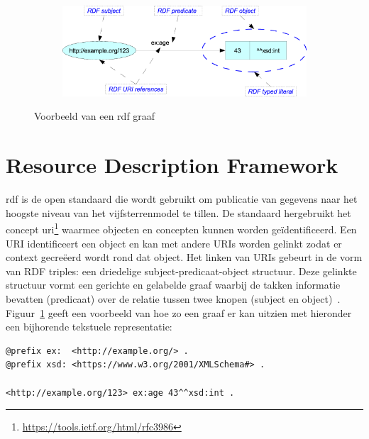 \begin{figure}
	\centering
	\begin{subfigure}{\textwidth}
		\centering
		\centerline{
			\includegraphics[scale=0.75]{images/rdfexample.png}
		}
	\end{subfigure}
	\caption{Voorbeeld van een \acrshort{rdf} graaf~\cite{rdfgraph_img}}
	\label{fig:rdf_example}
\end{figure}

\section{Resource Description Framework}
\label{sec:rdf}
\acrfull{rdf} is de open standaard die wordt gebruikt om publicatie van gegevens naar het hoogste niveau van het vijfsterrenmodel te tillen. De standaard hergebruikt het concept \acrfull{uri}\footnote{\url{https://tools.ietf.org/html/rfc3986}} waarmee objecten en concepten kunnen worden geïdentificeerd. Een URI identificeert een object en kan met andere URIs worden gelinkt zodat er context gecreëerd wordt rond dat object. Het linken van URIs gebeurt in de vorm van RDF triples: een driedelige subject-predicaat-object structuur. Deze gelinkte structuur vormt een gerichte en gelabelde graaf waarbij de takken informatie bevatten (predicaat) over de relatie tussen twee knopen (subject en object)~\cite{rdf_triple}. Figuur~\ref{fig:rdf_example} geeft een voorbeeld van hoe zo een graaf er kan uitzien met hieronder een bijhorende tekstuele representatie:

\begin{code}
\begin{verbatim}
@prefix ex:  <http://example.org/> .
@prefix xsd: <https://www.w3.org/2001/XMLSchema#> .

<http://example.org/123> ex:age 43^^xsd:int .
\end{verbatim}
\caption{RDF triple in turtle formaat}
\label{code:rdftriple}
\end{code}

